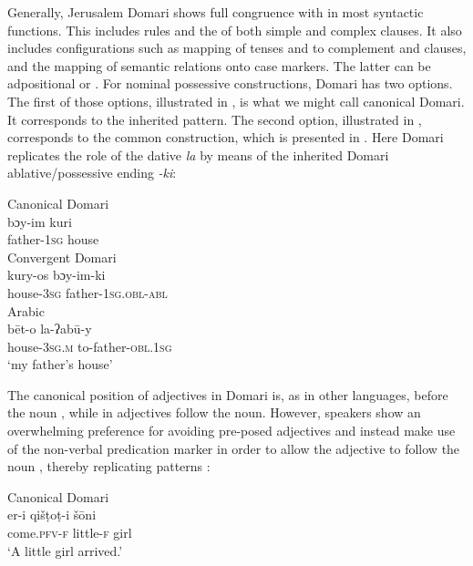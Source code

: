 \documentclass[output=paper]{langsci/langscibook}
\begin{document}
Generally, Jerusalem Domari shows full congruence with   in most syntactic functions. This includes  rules and the  of both simple and complex clauses. It also includes configurations such as mapping of tenses and  to complement and  clauses, and the mapping of semantic relations onto case markers. The latter can be adpositional or . For nominal possessive constructions, Domari has two options. The first of those options, illustrated in , is what we might call canonical Domari. It corresponds to the inherited  pattern. The second option, illustrated in , corresponds to the common   construction, which is presented in . Here Domari replicates the role of the  dative  \textit{la} by means of the inherited Domari ablative/possessive  ending \textit{-ki}:

\ea
\ea
{{Canonical} Domari}\\
\gll bɔy-im kuri    \\
     father-\textsc{1sg} house\\ \label{kuri}
\ex
{Convergent Domari}\\
\gll kury-os bɔy-im-ki  \\
       house-\textsc{3sg} father-\textsc{1sg.obl-abl}\\ \label{boy}
\ex
{Arabic}\\
\gll bēt-o la-ʔabū-y  \\
       house-\textsc{3sg.m} to-father-\textsc{obl.1sg}\\
\glt   ‘my father’s house’ \label{bett}
\z
\z

The canonical position of adjectives in Domari is, as in other  languages, before the noun , while in  adjectives follow the noun. However, speakers show an overwhelming preference for avoiding pre-posed adjectives and instead make use of the non-verbal predication marker in order to allow the adjective to follow the noun , thereby replicating   patterns :

\ea\label{girls}
\ea
{{Canonical} Domari}\\
\gll er-i qišṭoṭ-i šōni  \\
       come.\textsc{pfv-f} little-\textsc{f} girl\\
\glt   ‘A little girl arrived.’ \label{girla}
\end{document}
